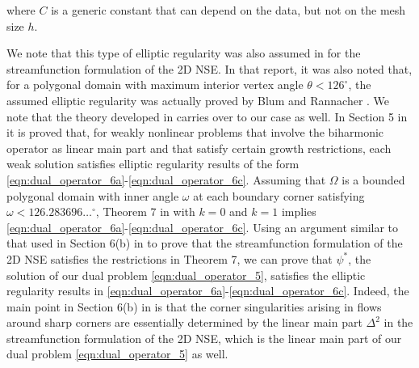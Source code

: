where $C$ is a generic constant that can depend on the data, but not on the
mesh size $h$.
\begin{remark}
  We note that this type of elliptic regularity was also assumed in \cite{Cayco86}
  for the streamfunction formulation of the 2D NSE.  In that report, it was also
  noted that, for a polygonal domain with maximum interior vertex angle $\theta <
  126^{\circ}$, the assumed elliptic regularity was actually proved by Blum and
  Rannacher \cite{Blum1980}.  We note that the theory developed in
  \cite{Blum1980} carries over to our case as well.  In Section 5 in
  \cite{Blum1980} it is proved that, for weakly nonlinear problems that
  involve the biharmonic operator as linear main part and that satisfy certain
  growth restrictions, each weak solution satisfies elliptic regularity results of
  the form \eqref{eqn:dual_operator_6a}-\eqref{eqn:dual_operator_6c}.  Assuming
  that $\Omega$ is a bounded polygonal domain with inner angle $\omega$ at each
  boundary corner satisfying $\omega < 126.283696\ldots^{\circ}$, Theorem 7 in
  \cite{Blum1980} with $k = 0$ and $k = 1$ implies
  \eqref{eqn:dual_operator_6a}-\eqref{eqn:dual_operator_6c}.  Using an argument
  similar to that used in Section 6(b) in \cite{Blum1980} to prove that
  the streamfunction formulation of the 2D NSE satisfies the restrictions in
  Theorem 7, we can prove that $\psi^*$, the solution of our dual problem
  \eqref{eqn:dual_operator_5}, satisfies the elliptic regularity results in
  \eqref{eqn:dual_operator_6a}-\eqref{eqn:dual_operator_6c}.  Indeed, the main
  point in Section 6(b) in \cite{Blum1980} is that the corner
  singularities arising in flows around sharp corners are essentially determined
  by the linear main part $\Delta^2$ in the streamfunction formulation of the 2D
  NSE, which is the linear main part of our dual problem
  \eqref{eqn:dual_operator_5} as well.
\end{remark}

